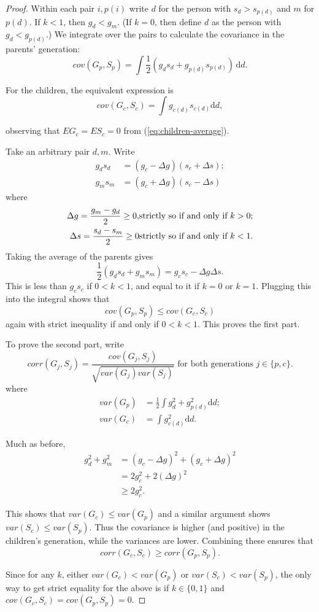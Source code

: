 \documentclass[
]{article}
\begin{document}
\begin{proof}


Within each pair $i,p(i)$ write $d$ for the person with $s_{d}>s_{p(d)}$
and $m$ for $p(d)$.  If
$k < 1$, then $g_{d} < g_{m}$. (If $k = 0$, then define $d$ as the person
with $g_{d} < g_{p(d)}$.) We integrate over the pairs to calculate the 
covariance in the parents' generation:
\[
cov(G_{p},S_{p})=\int\frac{1}{2}(g_{d}s_{d}+g_{p(d)}s_{p(d)})\,\mathrm{d}d.
\]

For the children, the equivalent expression is
\[
cov(G_{c},S_{c})=\int g_{c(d)}s_{c(d)}\mathrm{d}d,
\]

observing that $EG_{c} = ES_{c}=0$ from (\ref{eq:children-average}).

Take an arbitrary pair $d,m$. Write
\begin{align*}
g_{d}s_{d} & = (g_{c}-\Delta g)(s_{c}+\Delta s);\\
g_{m}s_{m} & = (g_{c}+\Delta g)(s_{c}-\Delta s)
\end{align*}
where 
\begin{align*}
\text{\ensuremath{\Delta g=\frac{g_{m}-g_{d}}{2}\ge0}}, & \textrm{strictly so if and only if }k>0;\\
\Delta s=\frac{s_{d}-s_{m}}{2}\ge0 & \textrm{strictly so if and only if }k<1.
\end{align*}
Taking the average of the parents gives
\[
\frac{1}{2}(g_{d}s_{d}+g_{m}s_{m})= g _{c}s_{c}-\Delta g\Delta s.
\]
This is less than $g_{c}s_{c}$ if $0 < k < 1$, and equal to it if $k = 0$
or $k = 1$. Plugging this into the integral shows that 
\[
cov(G_{p},S_{p})\le cov(G_{c},S_{c})
\]
again with strict inequality if and only if $0 < k < 1$. This proves the first
part. 

To prove the second part, write
\begin{equation}
corr(G_{j},S_{j})=\frac{cov(G_{j},S_{j})}{\sqrt{var(G_{j})var(S_{j})}}\textrm{ for both generations }j\in\{p,c\}.\label{eq:corr-cov-var}
\end{equation}
where 
\begin{align*}
var(G_{p}) & =\frac{1}{2}\int g_{d}^{2}+g_{p(d)}^{2}\textrm{d}d;\\
var(G_{c}) & =\int g_{c(d)}^{2}\textrm{d}d.
\end{align*}

Much as before,
\begin{align*}
g_{d}^{2}+g_{m}^{2} & =(g_{c}-\Delta g)^{2}+(g_{c}+\Delta g)^{2}\\
 & =2g_{c}^{2}+2(\Delta g)^{2}\\
 & \ge2g_{c}^{2}.
\end{align*}

This shows that $var(G_{c})\le var(G_{p})$ and a similar argument
shows $var(S_{c})\le var(S_{p})$. Thus the covariance is higher (and
positive) in the children's generation, while the variances are lower.
Combining these ensures that 
\[
corr(G_{c},S_{c}) \ge corr(G_{p},S_{p}).
\]

Since for any $k$, either $var(G_{c}) < var(G_{p})$ or $var(S_{c}) < var(S_{p})$,
the only way to get strict equality for the above is if $k \in \{0,1\}$
and $cov(G_{c}, S_{c}) = cov(G_{p},S_{p}) = 0$.

\end{proof}
\end{document}
